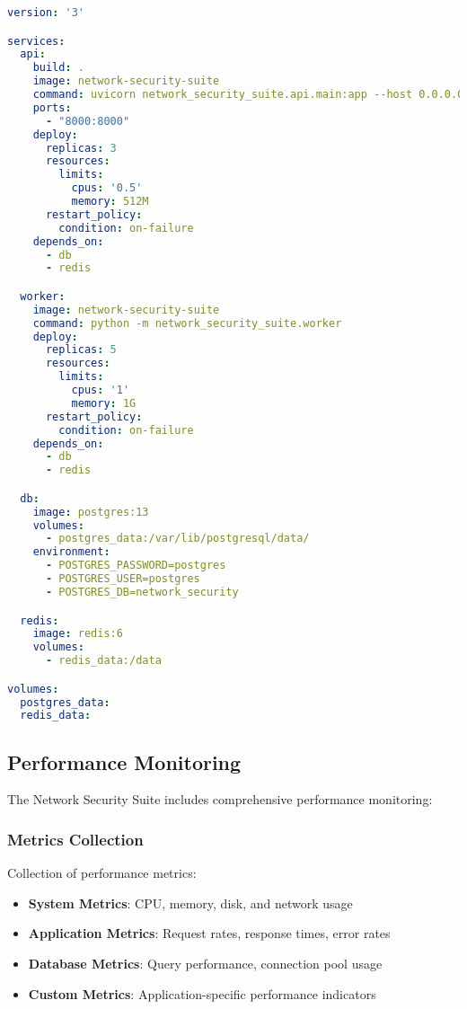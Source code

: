 \begin{lstlisting}[language=yaml, caption=Docker Compose Scaling]
version: '3'

services:
  api:
    build: .
    image: network-security-suite
    command: uvicorn network_security_suite.api.main:app --host 0.0.0.0 --port 8000
    ports:
      - "8000:8000"
    deploy:
      replicas: 3
      resources:
        limits:
          cpus: '0.5'
          memory: 512M
      restart_policy:
        condition: on-failure
    depends_on:
      - db
      - redis

  worker:
    image: network-security-suite
    command: python -m network_security_suite.worker
    deploy:
      replicas: 5
      resources:
        limits:
          cpus: '1'
          memory: 1G
      restart_policy:
        condition: on-failure
    depends_on:
      - db
      - redis

  db:
    image: postgres:13
    volumes:
      - postgres_data:/var/lib/postgresql/data/
    environment:
      - POSTGRES_PASSWORD=postgres
      - POSTGRES_USER=postgres
      - POSTGRES_DB=network_security

  redis:
    image: redis:6
    volumes:
      - redis_data:/data

volumes:
  postgres_data:
  redis_data:
\end{lstlisting}

\subsection{Performance Monitoring}
The Network Security Suite includes comprehensive performance monitoring:

\subsubsection{Metrics Collection}
Collection of performance metrics:

\begin{itemize}
    \item \textbf{System Metrics}: CPU, memory, disk, and network usage
    \item \textbf{Application Metrics}: Request rates, response times, error rates
    \item \textbf{Database Metrics}: Query performance, connection pool usage
    \item \textbf{Custom Metrics}: Application-specific performance indicators
\end{itemize}

